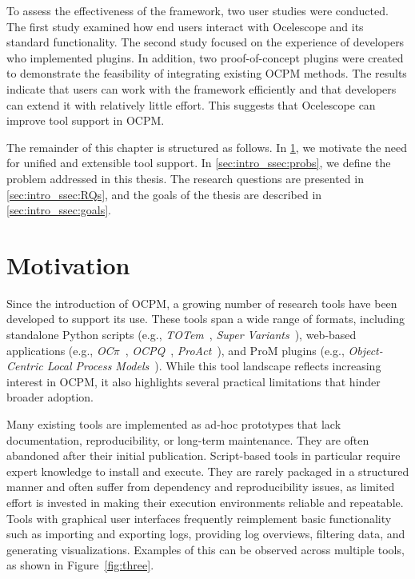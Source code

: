 To assess the effectiveness of the framework, two user studies were conducted. The first study examined how end users interact with Ocelescope and its standard functionality. The second study focused on the experience of developers who implemented plugins. In addition, two proof-of-concept plugins were created to demonstrate the feasibility of integrating existing OCPM methods. The results indicate that users can work with the framework efficiently and that developers can extend it with relatively little effort. This suggests that Ocelescope can improve tool support in OCPM.

The remainder of this chapter is structured as follows. In \cref{sec:intro_ssec:motiv}, we motivate the need for unified and extensible tool support. In \cref{sec:intro_ssec:probs}, we define the problem addressed in this thesis. The research questions are presented in \cref{sec:intro_ssec:RQs}, and the goals of the thesis are described in \cref{sec:intro_ssec:goals}.

\section{Motivation}
\label{sec:intro_ssec:motiv}

Since the introduction of OCPM, a growing number of research tools have been developed to support its use.
These tools span a wide range of formats, including standalone Python scripts (e.g., \textit{TOTem}~\cite{totem}, \textit{Super Variants}~\cite{supervariants}), web-based applications (e.g., \textit{OC$\pi$}~\cite{ocpi}, \textit{OCPQ}~\cite{ocpq}, \textit{ProAct}~\cite{proact}), and ProM plugins (e.g., \textit{Object-Centric Local Process Models}~\cite{oclpm}). While this tool landscape reflects increasing interest in OCPM, it also highlights several practical limitations that hinder broader adoption.

Many existing tools are implemented as ad-hoc prototypes that lack documentation, reproducibility, or long-term maintenance. They are often abandoned after their initial publication. Script-based tools in particular require expert knowledge to install and execute. They are rarely packaged in a structured manner and often suffer from dependency and reproducibility issues, as limited effort is invested in making their execution environments reliable and repeatable. Tools with graphical user interfaces frequently reimplement basic functionality such as importing and exporting logs, providing log overviews, filtering data, and generating visualizations. Examples of this can be observed across multiple tools, as shown in Figure~\ref{fig:three}.

